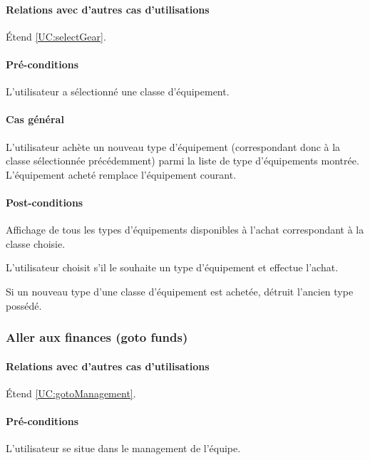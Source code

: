 \begin{list}{}{\leftmargin=1.5em}
\paragraph{Relations avec d'autres cas d'utilisations}
Étend \ref{UC:selectGear}.
\paragraph{Pré-conditions}
\begin{list}{}{\leftmargin=1.5em}
\item{L'utilisateur a sélectionné une classe d'équipement.}
\end{list}
\paragraph{Cas général}
L'utilisateur achète un nouveau type d'équipement (correspondant donc à la classe sélectionnée précédemment) parmi la liste de type d'équipements montrée. L'équipement acheté remplace l'équipement courant. 
\paragraph{Post-conditions}
\begin{list}{}{\leftmargin=1.5em}
\item{Affichage de tous les types d'équipements disponibles à l'achat correspondant à la classe choisie.}
\item{L'utilisateur choisit s'il le souhaite un type d'équipement et effectue l'achat.}
\item{Si un nouveau type d'une classe d'équipement est achetée, détruit l'ancien type possédé.}
\end{list}

\subsubsection{Aller aux finances (goto funds)}
\label{UC:gotoFunds}
\paragraph{Relations avec d'autres cas d'utilisations}
Étend \ref{UC:gotoManagement}.
\paragraph{Pré-conditions}
\begin{list}{}{\leftmargin=1.5em}
\item{L'utilisateur se situe dans le management de l'équipe.}
\end{list}

\end{list}
